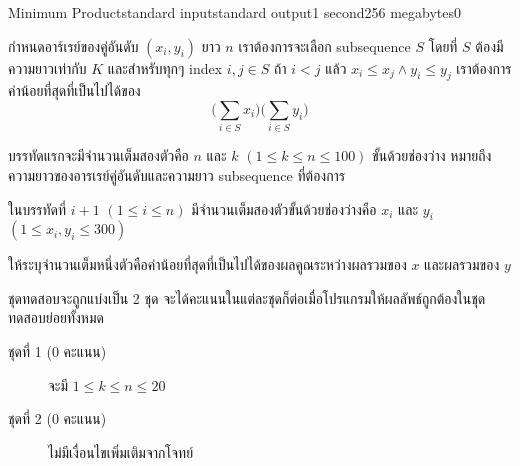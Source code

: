 \documentclass[11pt,a4paper]{article}
\begin{document}
\begin{problem}{Minimum Product}{standard input}{standard output}{1 second}{256 megabytes}{0}

กำหนดอาร์เรย์ของคู่อันดับ $(x_i, y_i)$ ยาว $n$ เราต้องการจะเลือก subsequence $S$ โดยที่ $S$ ต้องมีความยาวเท่ากับ $K$ และสำหรับทุกๆ index $i, j \in S$ ถ้า $i < j$ แล้ว $x_i \leq x_j \land y_i \leq y_j$ เราต้องการค่าน้อยที่สุดที่เป็นไปได้ของ $$\bigg(\sum_{i \in S} x_i\bigg)\bigg(\sum_{i \in S} y_i\bigg)$$

\InputFile
บรรทัดแรกจะมีจำนวนเต็มสองตัวคือ $n$ และ $k$ $(1 \leq k \leq n \leq 100)$ ขั้นด้วยช่องว่าง หมายถึงความยาวของอารเรย์คู่อันดับและความยาว subsequence ที่ต้องการ

ในบรรทัดที่ $i+1$ $(1 \leq i \leq n)$ มีจำนวนเต็มสองตัวขั้นด้วยช่องว่างคือ $x_i$ และ $y_i$ $(1 \leq x_i,y_i \leq 300)$


\OutputFile
ให้ระบุจำนวนเต็มหนึ่งตัวคือค่าน้อยที่สุดที่เป็นไปได้ของผลคูณระหว่างผลรวมของ $x$ และผลรวมของ $y$

\Scoring
ชุดทดสอบจะถูกแบ่งเป็น 2 ชุด จะได้คะแนนในแต่ละชุดก็ต่อเมื่อโปรแกรมให้ผลลัพธ์ถูกต้องในชุดทดสอบย่อยทั้งหมด
\begin{description}
\item[ชุดที่ 1 (0 คะแนน)] จะมี $1 \leq k \leq n \leq 20$

\item[ชุดที่ 2 (0 คะแนน)] ไม่มีเงื่อนไขเพิ่มเติมจากโจทย์
\end{description}

\Example

\begin{example}
%
\end{example}

\end{problem}
\end{document}
